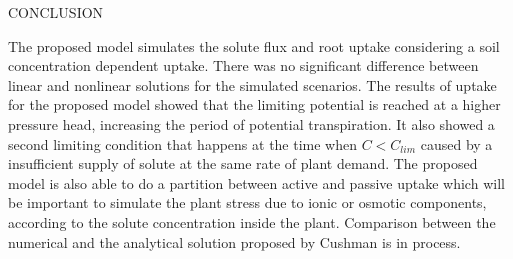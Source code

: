 \cleardoublepage
\chap CONCLUSION

The proposed model simulates the solute flux and root uptake considering a soil concentration dependent uptake. There was no significant difference between linear and nonlinear solutions for the simulated scenarios. The results of uptake for the proposed model showed that the limiting potential is reached at a higher pressure head, increasing the period of potential transpiration. It also showed a second limiting condition that happens at the time when $C<C_{lim}$ caused by a insufficient supply of solute at the same rate of plant demand. The proposed model is also able to do a partition between active and passive uptake which will be important to simulate the plant stress due to ionic or osmotic components, according to the solute concentration inside the plant.
Comparison between the numerical and the analytical solution proposed by Cushman is in process.

